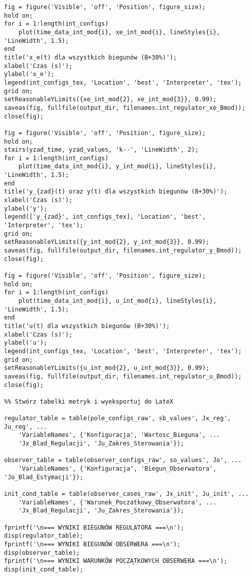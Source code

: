 \documentclass[a4paper,titlepage,11pt,floatssmall]{mwrep} %
\begin{document}
\begin{lstlisting}[style=custommatlab, caption={Pełny kod skryptu \texttt{combined\_plots.m}.}, label={lst:init_full}]
fig = figure('Visible', 'off', 'Position', figure_size);
hold on;
for i = 1:length(int_configs)
    plot(time_data_int_mod{i}, xe_int_mod{i}, lineStyles{i}, 'LineWidth', 1.5);
end
title('x_e(t) dla wszystkich biegunów (B+30%)');
xlabel('Czas (s)');
ylabel('x_e');
legend(int_configs_tex, 'Location', 'best', 'Interpreter', 'tex');
grid on;
setReasonableYLimits({xe_int_mod{2}, xe_int_mod{3}}, 0.99);
saveas(fig, fullfile(output_dir, filenames.int_regulator_xe_Bmod));
close(fig);

fig = figure('Visible', 'off', 'Position', figure_size);
hold on;
stairs(yzad_time, yzad_values, 'k--', 'LineWidth', 2);
for i = 1:length(int_configs)
    plot(time_data_int_mod{i}, y_int_mod{i}, lineStyles{i}, 'LineWidth', 1.5);
end
title('y_{zad}(t) oraz y(t) dla wszystkich biegunów (B+30%)');
xlabel('Czas (s)');
ylabel('y');
legend(['y_{zad}', int_configs_tex], 'Location', 'best', 'Interpreter', 'tex');
grid on;
setReasonableYLimits({y_int_mod{2}, y_int_mod{3}}, 0.99);
saveas(fig, fullfile(output_dir, filenames.int_regulator_y_Bmod));
close(fig);

fig = figure('Visible', 'off', 'Position', figure_size);
hold on;
for i = 1:length(int_configs)
    plot(time_data_int_mod{i}, u_int_mod{i}, lineStyles{i}, 'LineWidth', 1.5);
end
title('u(t) dla wszystkich biegunów (B+30%)');
xlabel('Czas (s)');
ylabel('u');
legend(int_configs_tex, 'Location', 'best', 'Interpreter', 'tex');
grid on;
setReasonableYLimits({u_int_mod{2}, u_int_mod{3}}, 0.99);
saveas(fig, fullfile(output_dir, filenames.int_regulator_u_Bmod));
close(fig);

%% Stwórz tabelki metryk i wyeksportuj do LateX

regulator_table = table(pole_configs_raw', sb_values', Jx_reg', Ju_reg', ...
    'VariableNames', {'Konfiguracja', 'Wartosc_Bieguna', ...
    'Jx_Blad_Regulacji', 'Ju_Zakres_Sterowania'});

observer_table = table(observer_configs_raw', so_values', Jo', ...
    'VariableNames', {'Konfiguracja', 'Biegun_Obserwatora', 'Jo_Blad_Estymacji'});

init_cond_table = table(observer_cases_raw', Jx_init', Ju_init', ...
    'VariableNames', {'Warunek_Poczatkowy_Obserwatora', ...
    'Jx_Blad_Regulacji', 'Ju_Zakres_Sterowania'});

fprintf('\n=== WYNIKI BIEGUNÓW REGULATORA ===\n');
disp(regulator_table);
fprintf('\n=== WYNIKI BIEGUNÓW OBSERWERA ===\n');
disp(observer_table);
fprintf('\n=== WYNIKI WARUNKÓW POCZĄTKOWYCH OBSERWERA ===\n');
disp(init_cond_table);


\end{lstlisting}
\end{document}
